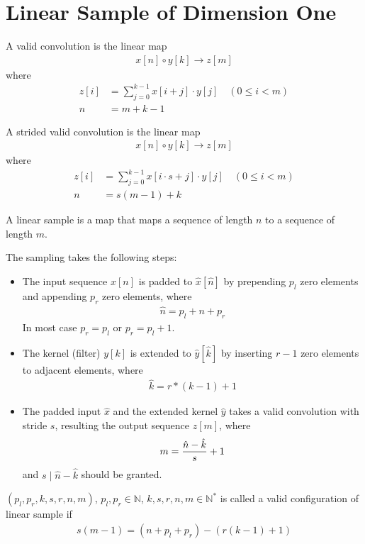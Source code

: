 \section{Linear Sample of Dimension One}

\begin{defi}
A valid convolution is the linear map
\begin{align*}
    x[n] \circ y[k] \to z[m]
\end{align*}
where
\begin{align*}
    z[i] &= \sum_{j=0}^{k - 1} x[i + j] \cdot y[j] \quad (0 \leq i < m) \\
    n &= m + k - 1
\end{align*}
\end{defi}

\begin{defi}
A strided valid convolution is the linear map
\begin{align*}
    x[n] \circ y[k] \to z[m]
\end{align*}
where
\begin{align*}
    z[i] &= \sum_{j=0}^{k - 1} x[i \cdot s + j] \cdot y[j] \quad (0 \leq i < m) \\
    n &= s (m - 1) + k
\end{align*}
\end{defi}

\begin{defi}
A linear sample is a map that maps a sequence of length $n$ to a sequence of
length $m$.
\end{defi}

The sampling takes the following steps:
\begin{itemize}
\item The input sequence $x[n]$ is padded to $\hat x[\hat n]$ by
prepending $p_l$ zero elements and appending $p_r$ zero elements, where
\begin{align*}
    \hat n = p_l + n + p_r
\end{align*}
In most case $p_r = p_l$ or $p_r = p_l + 1$.

\item The kernel (filter) $y[k]$ is extended to $\hat y[\hat k]$
by inserting $r - 1$ zero elements to adjacent elements, where
\begin{align*}
    \hat k = r * (k - 1) + 1
\end{align*}

\item The padded input $\hat x$ and the extended kernel $\hat y$ takes a
valid convolution with stride $s$, resulting the output sequence $z[m]$,
where
\begin{align*}
    m = {\hat n - \hat k \over s} + 1
\end{align*}
and $s \mid \hat n - \hat k$ should be granted.
\end{itemize}


$(p_l, p_r, k, s, r, n, m)$, $p_l, p_r \in \mathbb N$, $k, s, r, n, m \in \mathbb N^\ast$
is called a valid configuration of linear sample if
\begin{align*}
    s (m - 1) = (n + p_l + p_r) - (r (k - 1) + 1)
\end{align*}
